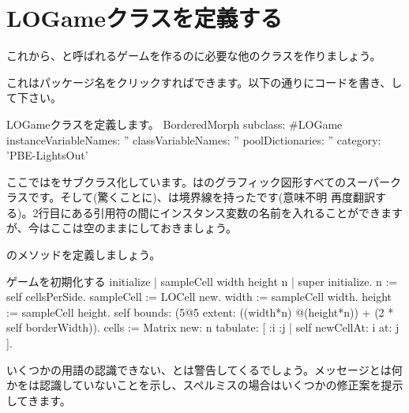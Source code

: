 \documentclass[a4paper,10pt,twoside]{book}
\begin{document}

\section{LOGameクラスを定義する}

これから、と呼ばれるゲームを作るのに必要な他のクラスを作りましょう。

これはパッケージ名をクリックすればできます。以下の通りにコードを書き、して下さい。

\begin{classdef}[sbegame]{LOGameクラスを定義します。}
BorderedMorph subclass: #LOGame
   instanceVariableNames: ''
   classVariableNames: ''
   poolDictionaries: ''
   category: 'PBE-LightsOut'
\end{classdef}

ここではをサブクラス化しています。は\pharo{}のグラフィック図形すべてのスーパークラスです。そして(驚くことに)、は境界線を持ったです(意味不明 再度翻訳する)。2行目にある引用符の間にインスタンス変数の名前を入れることができますが、今はここは空のままにしておきましょう。

のメソッドを定義しましょう。


\begin{numMethod}[sbegameinitialize]{ゲームを初期化する}
initialize
   | sampleCell width height n |
   super initialize.
   n := self cellsPerSide.
   sampleCell := LOCell new.
   width := sampleCell width.
   height := sampleCell height.
   self bounds: (5@5 extent: ((width*n) @(height*n)) + (2 * self borderWidth)).
   cells := Matrix new: n tabulate: [ :i :j | self newCellAt: i at: j ].
\end{numMethod}


いくつかの用語の認識できない、と\pharo{}は警告してくるでしょう。メッセージとは何かを\pharo{}は認識していないことを示し、スペルミスの場合はいくつかの修正案を提示してきます。
\end{document}
